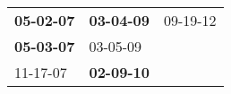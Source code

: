 \begin{supertabular}{p{0.33\columnwidth}p{0.33\columnwidth}p{0.33\columnwidth}}
 \textbf{05-02-07\textsuperscript{}} &  \textbf{03-04-09\textsuperscript{}} &  09-19-12\textsuperscript{} \\
 \textbf{05-03-07\textsuperscript{}} &           03-05-09\textsuperscript{} &                             \\
          11-17-07\textsuperscript{} &  \textbf{02-09-10\textsuperscript{}} &                             \\
\end{supertabular}
